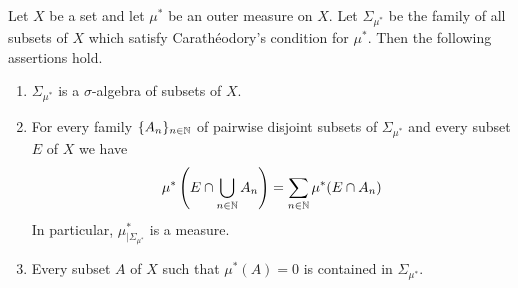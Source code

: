 \begin{theorem}\label{theorem:caratheodory_construction}
Let $X$ be a set and let $\mu^*$ be an outer measure on $X$. Let $\Sigma_{\mu^*}$ be the family of all subsets of $X$ which satisfy Carath{\'e}odory's condition for $\mu^*$. Then the following assertions hold.
\begin{enumerate}[label=\emph{\textbf{(\arabic*)}}, leftmargin=*]
\item $\Sigma_{\mu^*}$ is a $\sigma$-algebra of subsets of $X$.
\item For every family $\{A_n\}_{n\in {\mathbb N}}$ of pairwise disjoint subsets of $\Sigma_{\mu^*}$ and every subset $E$ of $X$ we have
$$\mu^*\left(E\cap \bigcup_{n\in {\mathbb N}}A_n\right)=\sum_{n\in {\mathbb N}}\mu^*(E\cap A_n)$$
In particular, $\mu^*_{\mid \Sigma_{\mu^*}}$ is a measure.
\item Every subset $A$ of $X$ such that $\mu^*(A)=0$ is contained in $\Sigma_{\mu^*}$.
\end{enumerate}
\end{theorem}

